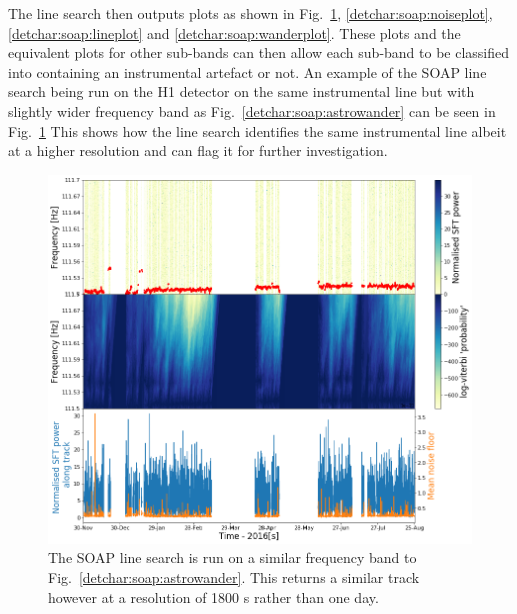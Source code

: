 The line search then outputs plots as shown in Fig.~\ref{detchar:soap:linewander}, \ref{detchar:soap:noiseplot}, \ref{detchar:soap:lineplot} and \ref{detchar:soap:wanderplot}. 
These plots and the equivalent plots for other sub-bands can then allow each sub-band to be classified into containing an instrumental artefact or not.
An example of the SOAP line search being run on the H1 detector on the same instrumental line but with slightly wider frequency band as Fig.~\ref{detchar:soap:astrowander} can be seen in Fig.~\ref{detchar:soap:linewander}
This shows how the line search identifies the same instrumental line albeit at a higher resolution and can flag it for further investigation.
%
\begin{figure}
	\centering
	\includegraphics[width=\textwidth]{C5_detchar/track_F111_5_111_7_wander_2.png}
	\caption[Example SOAP output for wandering line]{The SOAP line search is run on a similar frequency band to Fig.~\ref{detchar:soap:astrowander}. This returns a similar track however at a resolution of 1800 s rather than one day.}
	\label{detchar:soap:linewander}
\end{figure}
%

